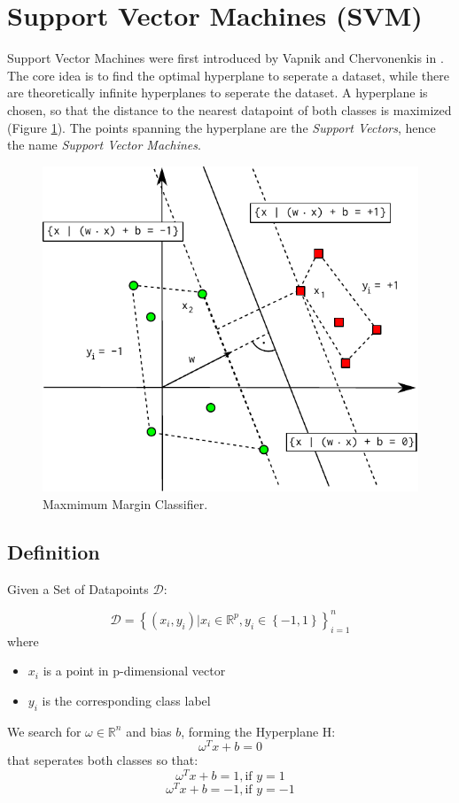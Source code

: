 \section{Support Vector Machines (SVM)}
Support Vector Machines were first introduced by Vapnik and Chervonenkis in \cite{VC74}. The core idea is to find the optimal hyperplane to seperate a dataset, while there are theoretically infinite hyperplanes to seperate the dataset. A hyperplane is chosen, so that the distance to the nearest datapoint of both classes is maximized (Figure \ref{fig:maximum_margin}). The points spanning the hyperplane are the \textit{Support Vectors}, hence the name \textit{Support Vector Machines}. \cite{VC95}

\begin{figure}
\begin{center}
\includegraphics[scale=0.7]{img/svm/margin.pdf}
\end{center}
 \caption{Maxmimum Margin Classifier.}
 \label{fig:maximum_margin}
\end{figure}

\subsection{Definition}
Given a Set of Datapoints $\mathcal{D}$:

$$\mathcal{D} = \left\{(x_i, y_i) | x_i \in \mathbb{R}^p, y_i \in \left\{-1,1\right\}\right\}_{i=1}^n$$
where
\begin{itemize}
 \item $x_i$ is a point in p-dimensional vector
 \item $y_i$ is the corresponding class label
\end{itemize}
We search for $\omega \in \mathbb{R}^n$ and bias $b$, forming the Hyperplane H:
$$\omega^T x + b = 0$$
that seperates both classes so that:
$$ \omega^T x + b = 1,\mbox{if } y = 1 $$
$$ \omega^T x + b = -1, \mbox{if } y = -1 $$

